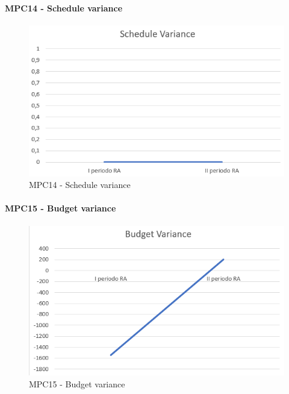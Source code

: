   \paragraph{MPC14 - Schedule variance}
  \begin{figure}[h!]
    \centering
      \includegraphics[scale=1]{Immagini/ScheduleVarianceA.PNG}
    \caption{MPC14 - Schedule variance}
  \end{figure}




  \paragraph{MPC15 - Budget variance}
  \begin{figure}[h!]
    \centering
      \includegraphics[scale=1]{Immagini/BudgetVarianceA.PNG}
    \caption{MPC15 - Budget variance}
  \end{figure}



  \clearpage
